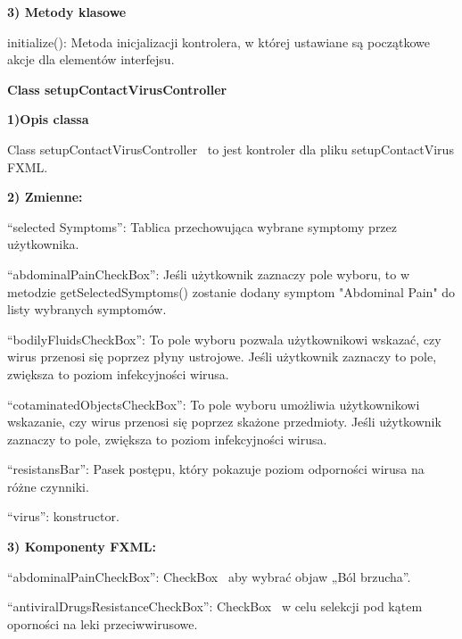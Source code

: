 \documentclass[a4paper]{article}
\begin{document}
\bigskip

\foreignlanguage{polish}{\textbf{3) Metody klasowe}}

\foreignlanguage{polish}{initialize(): Metoda inicjalizacji kontrolera, w której ustawiane są początkowe akcje dla
elementów interfejsu.}




\bigskip


\bigskip

{\centering
\foreignlanguage{english}{\textbf{Class setupContactVirusController}}
\par}
\vspace{6pt}
\foreignlanguage{english}{\textbf{1)Opis classa}}

\foreignlanguage{english}{Class setupContactVirusController \ to jest kontroler dla pliku setupContactVirus FXML.}
\bigskip

\foreignlanguage{english}{\textbf{2) Zmienne:}}

\foreignlanguage{polish}{“selected Symptoms”: Tablica przechowująca wybrane symptomy przez użytkownika.}

\foreignlanguage{polish}{“abdominalPainCheckBox”: Jeśli użytkownik zaznaczy pole wyboru, to w metodzie getSelectedSymptoms() zostanie dodany symptom "Abdominal Pain" do listy wybranych symptomów.}

\foreignlanguage{polish}{“bodilyFluidsCheckBox”: To pole wyboru pozwala użytkownikowi wskazać, czy wirus przenosi się poprzez płyny ustrojowe. Jeśli użytkownik zaznaczy to pole, zwiększa to poziom infekcyjności wirusa. }

\foreignlanguage{polish}{“cotaminatedObjectsCheckBox”: To pole wyboru umożliwia użytkownikowi wskazanie, czy wirus przenosi się poprzez skażone przedmioty. Jeśli użytkownik zaznaczy to pole, zwiększa to poziom infekcyjności wirusa. }

\foreignlanguage{polish}{“resistansBar”: Pasek postępu, który pokazuje poziom odporności wirusa na różne czynniki.}

\foreignlanguage{polish}{“virus”: konstructor. }

\bigskip

\foreignlanguage{english}{\textbf{3) Komponenty FXML:}}


\foreignlanguage{polish}{“abdominalPainCheckBox”: CheckBox \ aby wybrać objaw „Ból brzucha”.}

\foreignlanguage{polish}{“antiviralDrugsResistanceCheckBox”: CheckBox \ w celu selekcji pod kątem oporności na leki
przeciwwirusowe.}
\end{document}

